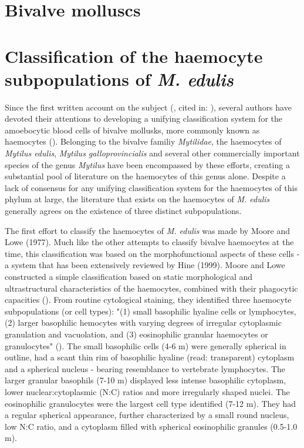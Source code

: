 \section{Bivalve molluscs}






\section{Classification of the haemocyte subpopulations of \emph{M. edulis}}
\label{subsection:haemocyte_classification}
Since the first written account on the subject (\cite{Cuenot1891}, cited in: \cite{Cheng1980}), several authors have devoted their attentions to developing a unifying classification system for the amoebocytic blood cells of bivalve mollusks, more commonly known as haemocytes (\cite{Cheng1980, delaBallina2022}). Belonging to the bivalve familiy \emph{Mytilidae}, the haemocytes of \emph{Mytilus edulis}, \emph{Mytilus galloprovincialis} and several other commercially important species of the genus \emph{Mytilus} have been encompassed by these efforts, creating a substantial pool of literature on the haemocytes of this genus alone. Despite a lack of consensus for any unifying classification system for the haemocytes of this phylum at large, the literature that exists on the haemocytes of \emph{M. edulis} generally agrees on the existence of three distinct subpopulations.

The first effort to classify the haemocytes of \emph{M. edulis} was made by Moore and Lowe (1977). Much like the other attempts to classify bivalve haemocytes at the time, this classification was based on the morphofunctional aspects of these cells - a system that has been extensively reviewed by Hine (1999). Moore and Lowe constructed a simple classification based on static morphological and ultrastructural characteristics of the haemocytes, combined with their phagocytic capacities (\cite{Moore1977}). From routine cytological staining, they identified three haemocyte subpopulations (or cell types): "(1) small basophilic hyaline cells or lymphocytes, (2) larger basophilic hemocytes with varying degrees of irregular cytoplasmic granulation and vacuolation, and (3) eosinophilic granular haemocytes or granulocytes" (\cite{Moore1977}). The small basophilic cells (4-6 \micro m) were generally spherical in outline, had a scant thin rim of basophilic hyaline (read: transparent) cytoplasm and a spherical nucleus - bearing resemblance to vertebrate lymphocytes. The larger granular basophils (7-10 \micro m) displayed less intense basophilic cytoplasm, lower nuclear:cytoplasmic (N:C) ratios and more irregularly shaped nuclei. The eosinophilic granulocytes were the largest cell type identified (7-12 \micro m). They had a regular spherical appearance, further characterized by a small round nucleus, low N:C ratio, and a cytoplasm filled with spherical eosinophilic granules (0.5-1.0 \micro m).

